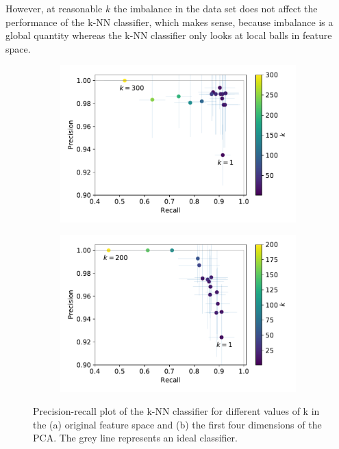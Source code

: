 \documentclass[12pt, a4paper]{scrartcl}
\begin{document}
However, at reasonable $k$ the imbalance in the data set does not affect the performance of the k-NN classifier, which makes sense, because imbalance is a global quantity whereas the k-NN classifier only looks at local balls in feature space.
\begin{figure}
	\centering
	 \begin{subfigure}[b]{0.45\textwidth}
	 	\includegraphics[width=\textwidth]{knn}
	 	\caption{}
	 	\label{fig:knn1}
    \end{subfigure}
	 \begin{subfigure}[b]{0.45\textwidth}
	 	\includegraphics[width=\textwidth]{knn_pca}
	 	\caption{}
	 	\label{fig:knn2}
    \end{subfigure}
	\caption{Precision-recall plot of the k-NN classifier for different values of k in the (a) original feature space and (b) the first four dimensions of the PCA. The grey line represents an ideal classifier.}
	\label{fig:knn}
\end{figure}
\end{document}
